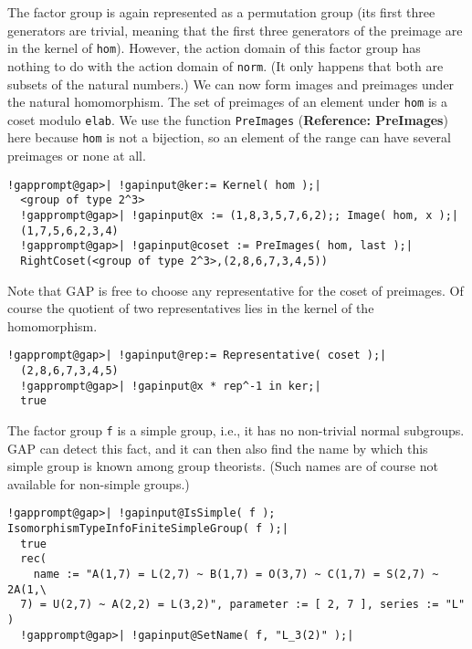 \documentclass[a4paper,11pt]{report}
\begin{document}
{{ The factor group is again represented as a permutation group (its first three
generators are trivial, meaning that the first three generators of the
preimage are in the kernel of \texttt{hom}). However, the action domain of this factor group has nothing to do with the
action domain of \texttt{norm}. (It only happens that both are subsets of the natural numbers.) We can now
form images and preimages under the natural homomorphism. The set of preimages
of an element under \texttt{hom} is a coset modulo \texttt{elab}. We use the function \texttt{PreImages} (\textbf{Reference: PreImages}) here because \texttt{hom} is not a bijection, so an element of the range can have several preimages or
none at all. 

 
\begin{Verbatim}[commandchars=!@|,fontsize=\small,frame=single,label=Example]
  !gapprompt@gap>| !gapinput@ker:= Kernel( hom );|
  <group of type 2^3>
  !gapprompt@gap>| !gapinput@x := (1,8,3,5,7,6,2);; Image( hom, x );|
  (1,7,5,6,2,3,4)
  !gapprompt@gap>| !gapinput@coset := PreImages( hom, last );|
  RightCoset(<group of type 2^3>,(2,8,6,7,3,4,5))
\end{Verbatim}
 

 Note that \textsf{GAP} is free to choose any representative for the coset of preimages. Of course the
quotient of two representatives lies in the kernel of the homomorphism. 

 
\begin{Verbatim}[commandchars=!@|,fontsize=\small,frame=single,label=Example]
  !gapprompt@gap>| !gapinput@rep:= Representative( coset );|
  (2,8,6,7,3,4,5)
  !gapprompt@gap>| !gapinput@x * rep^-1 in ker;|
  true
\end{Verbatim}
 

 The factor group \texttt{f} is a simple group, i.e., it has no non-trivial normal subgroups. \textsf{GAP} can detect this fact, and it can then also find the name by which this simple
group is known among group theorists. (Such names are of course not available
for non-simple groups.) 

 
\begin{Verbatim}[commandchars=!@|,fontsize=\small,frame=single,label=Example]
  !gapprompt@gap>| !gapinput@IsSimple( f ); IsomorphismTypeInfoFiniteSimpleGroup( f );|
  true
  rec( 
    name := "A(1,7) = L(2,7) ~ B(1,7) = O(3,7) ~ C(1,7) = S(2,7) ~ 2A(1,\
  7) = U(2,7) ~ A(2,2) = L(3,2)", parameter := [ 2, 7 ], series := "L" )
  !gapprompt@gap>| !gapinput@SetName( f, "L_3(2)" );|
\end{Verbatim}
 

}}
\end{document}
